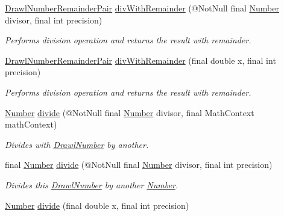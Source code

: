 \begin{DoxyCompactItemize}
\hyperlink{classcom_1_1aarrelaakso_1_1drawl_1_1_drawl_number_remainder_pair}{Drawl\+Number\+Remainder\+Pair} \hyperlink{classcom_1_1aarrelaakso_1_1drawl_1_1_drawl_number_a452c8b23180fe298592093adde0fa87e}{div\+With\+Remainder} (@Not\+Null final \hyperlink{interfacecom_1_1aarrelaakso_1_1drawl_1_1_number}{Number} divisor, final int precision)
\begin{DoxyCompactList}\small\item\em Performs division operation and returns the result with remainder. \end{DoxyCompactList}\item 
\hyperlink{classcom_1_1aarrelaakso_1_1drawl_1_1_drawl_number_remainder_pair}{Drawl\+Number\+Remainder\+Pair} \hyperlink{classcom_1_1aarrelaakso_1_1drawl_1_1_drawl_number_a6dc7cefb2574b9675ab3bc099760cbd2}{div\+With\+Remainder} (final double x, final int precision)
\begin{DoxyCompactList}\small\item\em Performs division operation and returns the result with remainder. \end{DoxyCompactList}\item 
\hyperlink{interfacecom_1_1aarrelaakso_1_1drawl_1_1_number}{Number} \hyperlink{classcom_1_1aarrelaakso_1_1drawl_1_1_drawl_number_ad6350a9965757a1ffeb859d71ee0219e}{divide} (@Not\+Null final \hyperlink{interfacecom_1_1aarrelaakso_1_1drawl_1_1_number}{Number} divisor, final Math\+Context math\+Context)
\begin{DoxyCompactList}\small\item\em Divides with \hyperlink{classcom_1_1aarrelaakso_1_1drawl_1_1_drawl_number}{Drawl\+Number} by another. \end{DoxyCompactList}\item 
final \hyperlink{interfacecom_1_1aarrelaakso_1_1drawl_1_1_number}{Number} \hyperlink{classcom_1_1aarrelaakso_1_1drawl_1_1_drawl_number_a24ee9901f4d84a2fc086d4e727bf40c7}{divide} (@Not\+Null final \hyperlink{interfacecom_1_1aarrelaakso_1_1drawl_1_1_number}{Number} divisor, final int precision)
\begin{DoxyCompactList}\small\item\em Divides this \hyperlink{classcom_1_1aarrelaakso_1_1drawl_1_1_drawl_number}{Drawl\+Number} by another \hyperlink{interfacecom_1_1aarrelaakso_1_1drawl_1_1_number}{Number}. \end{DoxyCompactList}\item 
\hyperlink{interfacecom_1_1aarrelaakso_1_1drawl_1_1_number}{Number} \hyperlink{classcom_1_1aarrelaakso_1_1drawl_1_1_drawl_number_a4ba0f1728e95fe494d440c04228041f7}{divide} (final double x, final int precision)

\end{DoxyCompactItemize}
